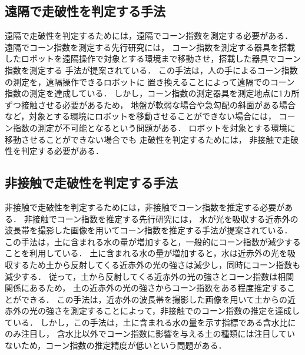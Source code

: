 \clearpage

\subsection{遠隔で走破性を判定する手法}\label{ssec:UnmannedMethod}

遠隔で走破性を判定するためには，遠隔でコーン指数を測定する必要がある．
遠隔でコーン指数を測定する先行研究には，
コーン指数を測定する器具を搭載したロボットを遠隔操作で対象とする環境まで移動させ，搭載した器具でコーン指数を測定する
手法が提案されている\cite{RobotWatch2002}\cite{Zacny2010}\cite{Chhaniyara2012}\cite{古谷2016}．
この手法は，人の手によるコーン指数の測定を，遠隔操作できるロボットに
置き換えることによって遠隔でのコーン指数の測定を達成している．
しかし，コーン指数の測定器具を測定地点に1カ所ずつ接触させる必要があるため，
地盤が軟弱な場合や急勾配の斜面がある場合など，対象とする環境にロボットを移動させることができない場合には，
コーン指数の測定が不可能となるという問題がある．
ロボットを対象とする環境に移動させることができない場合でも
走破性を判定するためには，
非接触で走破性を判定する必要がある．

\subsection{非接触で走破性を判定する手法}\label{ssec:NonContactMethod}

非接触で走破性を判定するためには，非接触でコーン指数を推定する必要がある．
非接触でコーン指数を推定する先行研究には，
水が光を吸収する近赤外の波長帯を撮影した画像を用いてコーン指数を推定する手法が提案されている\cite{Rankin2010}\cite{Fernandez2015}．
この手法は，土に含まれる水の量が増加すると，一般的にコーン指数が減少することを利用している．
土に含まれる水の量が増加すると，水は近赤外の光を吸収するため土から反射してくる近赤外の光の強さは減少し，同時にコーン指数も減少する．
従って，土から反射してくる近赤外の光の強さとコーン指数は相関関係にあるため，
土の近赤外の光の強さからコーン指数をある程度推定することができる．
この手法は，近赤外の波長帯を撮影した画像を用いて土からの近赤外の光の強さを測定することによって，非接触でのコーン指数の推定を達成している．
しかし，この手法は，土に含まれる水の量を示す指標である含水比にのみ注目し，
含水比以外でコーン指数に影響を与える土の種類には注目していないため，コーン指数の推定精度が低いという問題がある．

